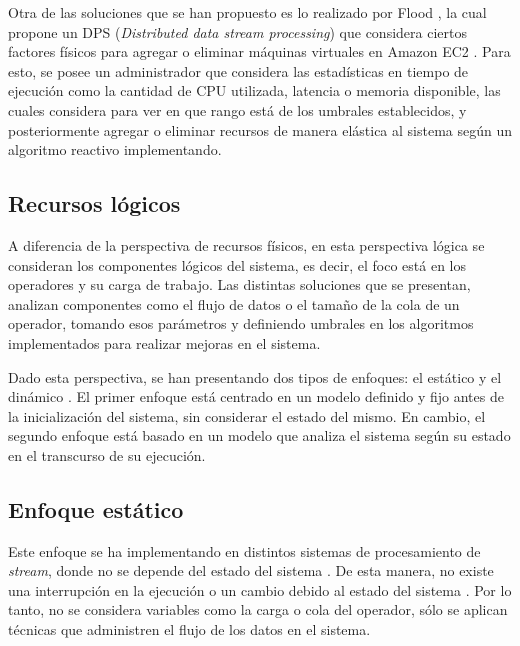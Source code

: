 Otra de las soluciones que se han propuesto es lo realizado por Flood \citep{Alves2010flood}, la cual propone un DPS (\textit{Distributed data stream processing}) que considera ciertos factores físicos para agregar o eliminar máquinas virtuales en Amazon EC2 \citep{amazonec2}. Para esto, se posee un administrador que considera las estadísticas en tiempo de ejecución como la cantidad de CPU utilizada, latencia o memoria disponible, las cuales considera para ver en que rango está de los umbrales establecidos, y posteriormente agregar o eliminar recursos de manera elástica al sistema según un algoritmo reactivo implementando.

\subsection{Recursos lógicos}
\label{subsec:recLogicosBC}

A diferencia de la perspectiva de recursos físicos, en esta perspectiva lógica se consideran los componentes lógicos del sistema, es decir, el foco está en los operadores y su carga de trabajo. Las distintas soluciones que se presentan, analizan componentes como el flujo de datos o el tamaño de la cola de un operador, tomando esos parámetros y definiendo umbrales en los algoritmos implementados para realizar mejoras en el sistema.


Dado esta perspectiva, se han presentando dos tipos de enfoques: el estático y el dinámico \citep{Gupta99loadsharing}. El primer enfoque está centrado en un modelo definido y fijo antes de la inicialización del sistema, sin considerar el estado del mismo. En cambio, el segundo enfoque está basado en un modelo que analiza el sistema según su estado en el transcurso de su ejecución.


\subsection{Enfoque estático}
\label{subsec:enfoqueEstaticoBC}
Este enfoque se ha implementando en distintos sistemas de procesamiento de \textsl{stream}, donde no se depende del estado del sistema \citep{stormtwitter, s4}. De esta manera, no existe una interrupción en la ejecución o un cambio debido al estado del sistema \citep{CasavantK88}. Por lo tanto, no se considera variables como la carga o cola del operador, sólo se aplican técnicas que administren el flujo de los datos en el sistema.

